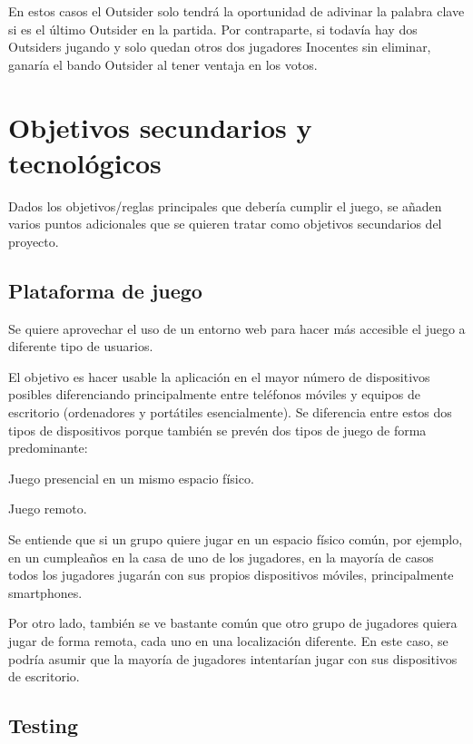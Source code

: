 En estos casos el Outsider solo tendrá la oportunidad de adivinar la palabra clave si es el último Outsider en la partida. Por contraparte, si 
todavía hay dos Outsiders jugando y solo quedan otros dos jugadores Inocentes sin eliminar, ganaría el bando Outsider al tener ventaja en los 
votos.

\section{Objetivos secundarios y tecnológicos}

Dados los objetivos/reglas principales que debería cumplir el juego, se añaden varios puntos adicionales que se quieren
tratar como objetivos secundarios del proyecto.

\subsection{Plataforma de juego}

Se quiere aprovechar el uso de un entorno web para hacer más accesible el juego a diferente tipo de usuarios.

El objetivo es hacer usable la aplicación en el mayor número de dispositivos posibles diferenciando principalmente entre
teléfonos móviles y equipos de escritorio (ordenadores y portátiles esencialmente). Se diferencia entre estos dos tipos de
dispositivos porque también se prevén dos tipos de juego de forma predominante:

\begin{compactitem}
    \item Juego presencial en un mismo espacio físico.
    \item Juego remoto.
\end{compactitem}

Se entiende que si un grupo quiere jugar en un espacio físico común, por ejemplo, en un cumpleaños en la casa de uno de los
jugadores, en la mayoría de casos todos los jugadores jugarán con sus propios dispositivos móviles, principalmente smartphones.

Por otro lado, también se ve bastante común que otro grupo de jugadores quiera jugar de forma remota, cada uno en una
localización diferente. En este caso, se podría asumir que la mayoría de jugadores intentarían jugar con sus dispositivos de
escritorio.

\subsection{Testing}


